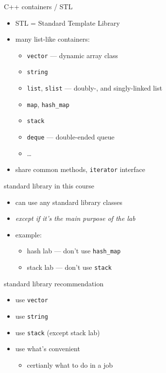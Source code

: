\begin{frame}{C++ containers / STL}
    \begin{itemize}
    \item STL = Standard Template Library
    \item many list-like containers:
        \begin{itemize}
        \item \texttt{vector} --- dynamic array class
        \item \texttt{string}
        \item \texttt{list}, \texttt{slist} --- doubly-, and singly-linked list
        \item \texttt{map}, \texttt{hash\_map}
        \item \texttt{stack}
        \item \texttt{deque} --- double-ended queue
        \item \ldots
        \end{itemize}
    \item share common methods, \texttt{iterator} interface
    \end{itemize}
\end{frame}

\begin{frame}{standard library in this course}
    \begin{itemize}
    \item can use any standard library classes
    \item \textit{except if it's the main purpose of the lab}
    \item example:
        \begin{itemize}
        \item hash lab --- don't use \texttt{hash\_map}
        \item stack lab --- don't use \texttt{stack}
        \end{itemize}
    \end{itemize}
\end{frame}

\begin{frame}{standard library recommendation}
    \begin{itemize}
        \item use \texttt{vector}
        \item use \texttt{string}
        \item use \texttt{stack} (except stack lab)
        \item use what's convenient
            \begin{itemize}
            \item certianly what to do in a job
            \end{itemize}
    \end{itemize}
\end{frame}
